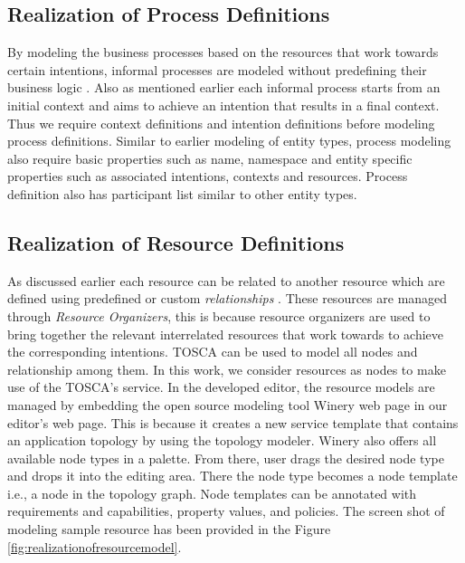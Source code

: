 \subsection{Realization of Process Definitions}
By modeling the business processes based on the resources that work towards certain intentions, informal processes are modeled without predefining their business logic \cite{Sungur2014a}. Also as mentioned earlier each informal process starts from an initial context and aims to achieve an intention that results in a final context. Thus we require context definitions and intention definitions before modeling process definitions. Similar to earlier modeling of entity types, process modeling also require basic properties such as name, namespace  and entity specific properties such as associated intentions, contexts and resources. Process definition also has participant list similar to other entity types. 

\subsection{Realization of Resource Definitions}
As discussed earlier each resource can be related to another resource which are defined using predefined or custom \textit{relationships} \cite{Sungur2014a}. These resources are managed through \textit{Resource Organizers}, this is because resource organizers are used to bring together the relevant interrelated resources that work towards to achieve the corresponding intentions. TOSCA \cite{Binz2014} can be used to model all nodes and relationship among them. In this work, we consider resources as nodes to make use of the TOSCA's service. In the developed editor, the resource models are managed by embedding the open source modeling tool Winery web page \cite{Kopp2013} in our editor's web page. This is because it creates a new service template that contains an application topology by using the topology modeler. Winery also offers all available node types in a palette. From there, user drags the desired node type and drops it into the editing area. There the node type
becomes a node template i.e., a node in the topology graph. Node templates can be annotated with requirements and capabilities, property values, and policies. The screen shot of modeling sample resource has been provided in the Figure \ref{fig:realizationofresourcemodel}. 

